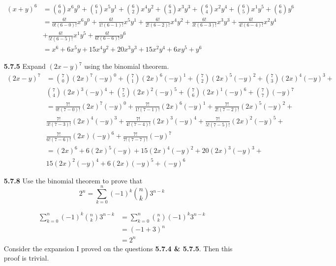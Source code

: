 \documentclass[12pt]{article}
\begin{document}
\begin{enumerate}
    \begin{align*}
        (x+y)^6 &= \binom{6}{0}x^6y^0+ \binom{6}{1}x^5y^1+ \binom{6}{2}x^4y^2+ \binom{6}{3}x^3y^3+ \binom{6}{4}x^2y^4+ \binom{6}{5}x^1y^5 + \binom{6}{6}y^6\\
                &= \frac{6!}{0!(6-0)!}x^6y^0+ \frac{6!}{1!(6-1)!}x^5y^1+ \frac{6!}{2!(6-2)!}x^4y^2+ \frac{6!}{3!(6-3)!}x^3y^3+ \frac{6!}{4!(6-4)!}x^2y^4\\
                &+ \frac{6!}{5!(6-5)!}x^1y^5 + \frac{6!}{6!(6-6)!}y^6\\
                &=x^6 + 6x^5y + 15x^4y^2 + 20x^3y^3 + 15x^2y^4 + 6xy^5 + y^6
    \end{align*}
    
    \newpage
    \item[\bf 5.7.5] Expand $(2x-y)^7$ using the binomial theorem.\\
    
    \begin{align*}
        (2x-y)^7 &= \binom{7}{0}(2x)^7(-y)^0+ \binom{7}{1}(2x)^6(-y)^1+ \binom{7}{2}(2x)^5(-y)^2+ \binom{7}{3}(2x)^4(-y)^3+\\ 
                & \binom{7}{4}(2x)^3(-y)^4 + \binom{7}{5}(2x)^2(-y)^5 + \binom{7}{6}(2x)^1(-y)^6 + \binom{7}{7}(-y)^7\\[1em]
                &= \frac{7!}{0!(7-0)!}(2x)^7(-y)^0+ \frac{7!}{1!(7-1)!}(2x)^6(-y)^1+ \frac{7!}{2!(7-2)!}(2x)^5(-y)^2+\\
                & \frac{7!}{3!(7-3)!}(2x)^4(-y)^3 + \frac{7!}{4!(7-4)!}(2x)^3(-y)^4 + \frac{7!}{5!(7-5)!}(2x)^2(-y)^5 +\\
                & \frac{7!}{6!(7-6)!}(2x)(-y)^6 + \frac{7!}{7!(7-7)!}(-y)^7\\[1em]
                &=(2x)^6 + 6(2x)^5(-y) + 15(2x)^4(-y)^2 + 20(2x)^3(-y)^3 +\\
                & 15(2x)^2(-y)^4 + 6(2x)(-y)^5 + (-y)^6
    \end{align*}
    
    \vspace{1.5\baselineskip}
    \item[\bf 5.7.8] Use the binomial theorem to prove that
    $$2^n=\sum\limits_{k=0}^n(-1)^k \binom{n}{k}3^{n-k}$$
    
    \begin{align*}
        \sum\limits_{k=0}^n(-1)^k \binom{n}{k}3^{n-k} &= \sum\limits_{k=0}^n \binom{n}{k}(-1)^k 3^{n-k}\\
        &=(-1+3)^n \\
        &= 2^n
    \end{align*}
    Consider the expansion I proved on the questions {\bf 5.7.4 \& 5.7.5}. Then this proof is trivial.
    

\end{enumerate}
\end{document}
